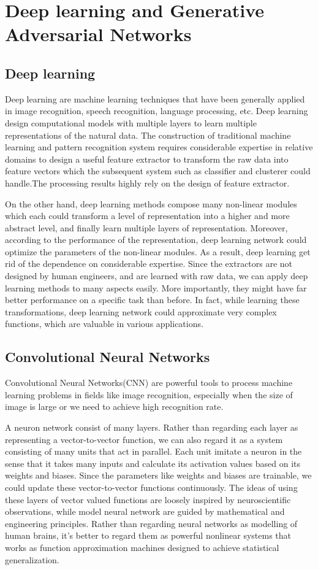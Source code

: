 
\chapter{Deep learning and Generative Adversarial Networks}



\section{Deep learning}
Deep learning are machine learning techniques that have been generally applied in image recognition, speech recognition, language processing, etc. Deep learning design computational models with multiple layers to learn multiple representations of the natural data. The construction of traditional machine learning and pattern recognition system requires considerable expertise in relative domains to design a useful feature extractor to transform the raw data into feature vectors which the subsequent system such as classifier and clusterer could handle.The processing results highly rely on the design of feature extractor. 

On the other hand, deep learning methods compose many non-linear modules which each could transform a level of representation into a higher and more abstract level, and finally learn multiple layers of representation. Moreover, according to the performance of the representation, deep learning network could optimize the parameters of the non-linear modules. As a result, deep learning get rid of the dependence on considerable expertise. Since the extractors are not designed by human engineers, and are learned with raw data, we can apply deep learning methods to many aspects easily. More importantly, they might have far better performance on a specific task than before. In fact, while learning these transformations, deep learning network could approximate very complex functions, which are valuable in various applications.


\section{Convolutional Neural Networks}
Convolutional Neural Networks(CNN) are powerful tools to process machine learning problems in fields like image recognition, especially when the size of image is large or we need to achieve high recognition rate.

A neuron network consist of many layers. Rather than regarding each layer as representing a vector-to-vector function, we can also regard it as a system consisting of many units that act in parallel. Each unit imitate a neuron in the sense that it takes many inputs and calculate its activation values based on its weights and biases. Since the parameters like weights and biases are trainable, we could update these vector-to-vector functions continuously. The ideas of using these layers of vector valued functions are loosely inspired by neuroscientific observations, while model neural network are guided by mathematical and engineering principles. Rather than regarding neural networks as modelling of human brains, it's better to regard them as powerful nonlinear systems that works as function approximation machines designed to achieve statistical generalization.


